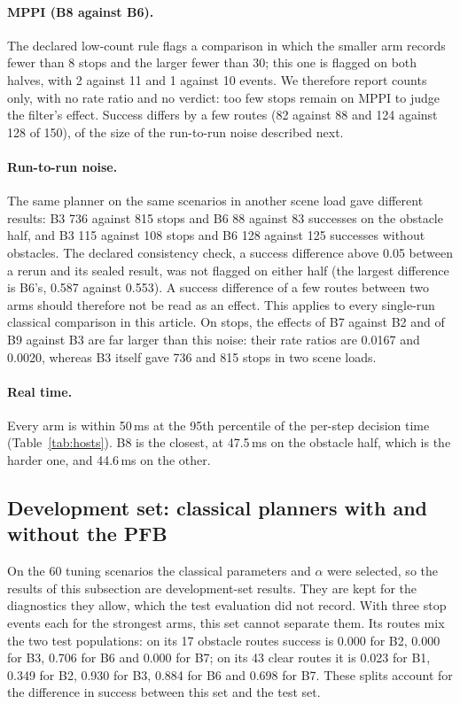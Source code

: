 \documentclass[11pt]{article}
\theoremstyle{definition}
\begin{document}
\paragraph{MPPI (B8 against B6).} The declared low-count rule flags a comparison in which the smaller arm records fewer than 8
stops and the larger fewer than 30; this one is flagged on both halves, with 2 against 11 and 1 against 10 events. We
therefore report counts only, with no rate ratio and no verdict: too few stops remain on MPPI to judge the filter's effect.
Success differs by a few routes (82 against 88 and 124 against 128 of 150), of the size of the run-to-run noise described
next.

\paragraph{Run-to-run noise.} The same planner on the same scenarios in another scene load gave different results: B3 736
against 815 stops and B6 88 against 83 successes on the obstacle half, and B3 115 against 108 stops and B6 128 against 125
successes without obstacles. The declared consistency check, a success difference above 0.05 between a rerun and its sealed
result, was not flagged on either half (the largest difference is B6's, 0.587 against 0.553). A success difference of a few
routes between two arms should therefore not be read as an effect. This applies to every single-run classical comparison in
this article. On stops, the effects of B7 against B2 and of B9 against B3 are far larger than this noise: their rate ratios
are 0.0167 and 0.0020, whereas B3 itself gave 736 and 815 stops in two scene loads.

\paragraph{Real time.} Every arm is within 50\,ms at the 95th percentile of the per-step decision time (Table~\ref{tab:hosts}).
B8 is the closest, at 47.5\,ms on the obstacle half, which is the harder one, and 44.6\,ms on the other.

\subsection{Development set: classical planners with and without the PFB}
On the 60 tuning scenarios the classical parameters and $\alpha$ were selected, so the results of this subsection
are development-set results. They are kept for the diagnostics they allow, which the test evaluation did not
record. With three stop events each for the strongest arms, this set cannot separate them. Its routes mix the two
test populations: on its 17 obstacle routes success is 0.000 for B2, 0.000 for B3, 0.706 for B6 and 0.000 for B7;
on its 43 clear routes it is 0.023 for B1, 0.349 for B2, 0.930 for B3, 0.884 for B6 and 0.698 for B7. These splits
account for the difference in success between this set and the test set.
\end{document}
